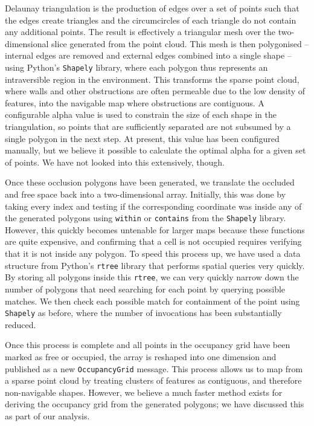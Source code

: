 \documentclass[10pt,english]{article}
\begin{document}
Delaunay triangulation is the production of edges over a set of points such that the edges create triangles and the circumcircles of each triangle do not contain any additional points. The result is effectively a triangular mesh over the two-dimensional slice generated from the point cloud. This mesh is then polygonised -- internal edges are removed and external edges combined into a single shape -- using Python's \texttt{Shapely} library, where each polygon thus represents an intraversible region in the environment. This transforms the sparse point cloud, where walls and other obstructions are often permeable due to the low density of features, into the navigable map where obstructions are contiguous. A configurable alpha value is used to constrain the size of each shape in the triangulation, so points that are sufficiently separated are not subsumed by a single polygon in the next step. At present, this value has been configured manually, but we believe it possible to calculate the optimal alpha for a given set of points. We have not looked into this extensively, though.

Once these occlusion polygons have been generated, we translate the occluded and free space back into a two-dimensional array. Initially, this was done by taking every index and testing if the corresponding coordinate was inside any of the generated polygons using \texttt{within} or \texttt{contains} from the \texttt{Shapely} library. However, this quickly becomes untenable for larger maps because these functions are quite expensive, and confirming that a cell is not occupied requires verifying that it is not inside any polygon. To speed this process up, we have used a data structure from Python's \texttt{rtree} library that performs spatial queries very quickly. By storing all polygons inside this \texttt{rtree}, we can very quickly narrow down the number of polygons that need searching for each point by querying possible matches. We then check each possible match for containment of the point using \texttt{Shapely} as before, where the number of invocations has been substantially reduced.

Once this process is complete and all points in the occupancy grid have been marked as free or occupied, the array is reshaped into one dimension and published as a new \texttt{OccupancyGrid} message. This process allows us to map from a sparse point cloud by treating clusters of features as contiguous, and therefore non-navigable shapes. However, we believe a much faster method exists for deriving the occupancy grid from the generated polygons; we have discussed this as part of our analysis.
\end{document}
